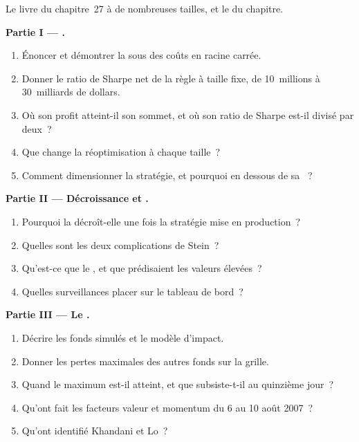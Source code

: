 \begin{problem}\label{pb:rs:capacity-decay-and-crowding:1}
Le livre du chapitre~27 à de nombreuses tailles, et le  du chapitre.

\medskip\noindent\textbf{Partie I --- .}
\begin{enumerate}
\item Énoncer et démontrer la  sous des coûts en racine carrée.
\item Donner le ratio de Sharpe net de la règle à taille fixe, de 10~millions à 30~milliards de dollars.
\item Où son profit atteint-il son sommet, et où son ratio de Sharpe est-il divisé par deux~?
\item Que change la réoptimisation à chaque taille~?
\item Comment dimensionner la stratégie, et pourquoi en dessous de sa ~?
\end{enumerate}

\medskip\noindent\textbf{Partie II --- Décroissance et .}
\begin{enumerate}[resume]
\item Pourquoi la  décroît-elle une fois la stratégie mise en production~?
\item Quelles sont les deux complications de Stein~?
\item Qu'est-ce que le , et que prédisaient les valeurs élevées~?
\item Quelles surveillances placer sur le tableau de bord~?
\end{enumerate}

\medskip\noindent\textbf{Partie III --- Le .}
\begin{enumerate}[resume]
\item Décrire les fonds simulés et le modèle d'impact.
\item Donner les pertes maximales des autres fonds sur la grille.
\item Quand le maximum est-il atteint, et que subsiste-t-il au quinzième jour~?
\item Qu'ont fait les facteurs valeur et momentum du 6 au 10 août 2007~?
\item Qu'ont identifié Khandani et Lo~?
\end{enumerate}


\end{problem}
